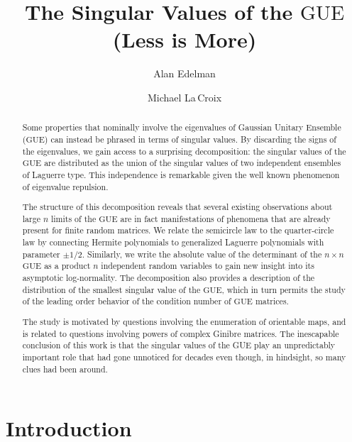 \documentclass[pdftex, oneside, 10pt, letterpaper]{amsart}
\title{The Singular Values of the {\ensuremath{\mathrm{GUE}}}{} (Less is More)}
\author{Alan Edelman}
\author{Michael La$\,$Croix}
\theoremstyle{plain}
\theoremstyle{definition}
\theoremstyle{remark}
\begin{document}
\begin{abstract}
  Some properties that nominally involve the eigenvalues of Gaussian
  Unitary Ensemble ({\ensuremath{\mathrm{GUE}}}{}) can instead be phrased in terms of
  singular values.  By discarding the signs of the eigenvalues, we
  gain access to a surprising decomposition: the singular values of
  the {\ensuremath{\mathrm{GUE}}}{} are distributed as the union of the singular values of
  two independent ensembles of Laguerre type.  
  This independence is remarkable given the well known phenomenon of
  eigenvalue repulsion.

  The structure of this decomposition reveals that several existing
  observations about large $n$ limits of the {\ensuremath{\mathrm{GUE}}}{} are in fact
  manifestations of phenomena that are already present for finite
  random matrices.  We relate the semicircle law to the quarter-circle
  law by connecting Hermite polynomials to generalized Laguerre
  polynomials with parameter $\pm1/2$.  Similarly, we write the
  absolute value of the determinant of the $n\times{}n$ {\ensuremath{\mathrm{GUE}}}{} as a
  product $n$ independent random variables to gain new insight into
  its asymptotic log-normality.  The decomposition also provides a
  description of the distribution of the smallest singular
  value of the {\ensuremath{\mathrm{GUE}}}{}, which in turn permits the study of the leading
  order behavior of the condition number of {\ensuremath{\mathrm{GUE}}}{} matrices.

  The study is motivated by questions involving the enumeration of
  orientable maps, and is related to questions involving powers of
  complex Ginibre matrices.  The inescapable conclusion of this work
  is that the singular values of the GUE play an unpredictably
  important role that had gone unnoticed for decades even though, in
  hindsight, so many clues had been around.
\end{abstract}

\maketitle

\section{Introduction}
\end{document}
